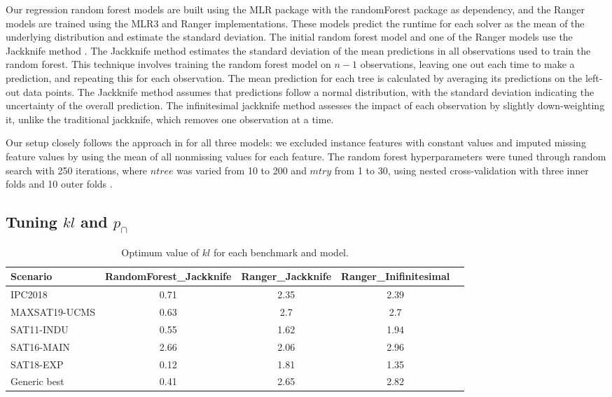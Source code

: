 Our regression random forest models are built using the MLR package with the randomForest package as dependency, and the Ranger models are trained using the MLR3 and Ranger implementations. These models predict the runtime for each solver as the mean of the underlying distribution and estimate the standard deviation. The initial random forest model and one of the Ranger models use the Jackknife method \cite{wager2014confidence, mlr}. 
The Jackknife method estimates the standard deviation of the mean predictions in all observations used to train the random forest. This technique involves training the random forest model on $n-1$ observations, leaving one out each time to make a prediction, and repeating this for each observation. The mean prediction for each tree is calculated by averaging its predictions on the left-out data points. The Jackknife method assumes that predictions follow a normal distribution, with the standard deviation indicating the uncertainty of the overall prediction. The infinitesimal jackknife method assesses the impact of each observation by slightly down-weighting it, unlike the traditional jackknife, which removes one observation at a time.

Our setup closely follows the approach in \cite{BISCHL201641} for all three models: we excluded instance features with constant values and imputed missing feature values by using the mean of all nonmissing values for each feature. The random forest hyperparameters were tuned through random search with 250 iterations, where $ntree$ was varied from 10 to 200 and
$mtry$ from 1 to 30, using nested cross-validation with three inner folds and 10 outer folds \cite{BISCHL201641}.

\subsection{Tuning $kl$ and $p_{\cap}$}

\begin{table}
\centering
\caption{Optimum value of $kl$ for each benchmark and model.}
\label{tab:kl}
\begin{tabular}{p{3.6cm} cccc}
\toprule
Scenario & RandomForest\_Jackknife & Ranger\_Jackknife & Ranger\_Inifinitesimal\\
\midrule
IPC2018 & 0.71 & 2.35 & 2.39 \\
MAXSAT19-UCMS & 0.63 & 2.7 & 2.7\\
SAT11-INDU & 0.55 & 1.62 & 1.94\\
SAT16-MAIN & 2.66 & 2.06 & 2.96\\
SAT18-EXP & 0.12 & 1.81 & 1.35\\
\midrule
Generic best & 0.41 & 2.65 & 2.82\\
\bottomrule
\end{tabular}
\end{table}

